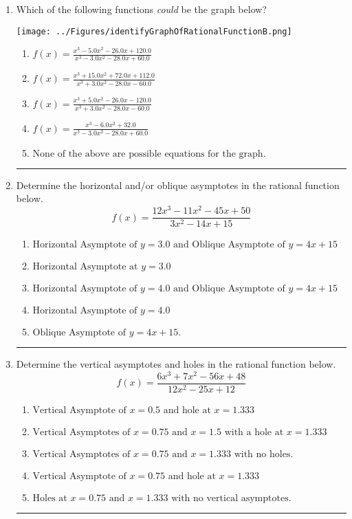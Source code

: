\documentclass[14pt]{extbook}
\newcommand{\litem}[1]{\item#1\hspace*{-1cm}\rule{\textwidth}{0.4pt}}
\begin{document}
\begin{enumerate}
\litem{
Which of the following functions \textit{could} be the graph below?
\begin{center}
    \texttt{[image: ../Figures/identifyGraphOfRationalFunctionB.png]}
\end{center}
\begin{enumerate}[label=\Alph*.]
\item \( f(x)=\frac{x^{3} -5.0 x^{2} -26.0 x + 120.0}{x^{3} -3.0 x^{2} -28.0 x + 60.0} \)
\item \( f(x)=\frac{x^{3} +15.0 x^{2} +72.0 x + 112.0}{x^{3} +3.0 x^{2} -28.0 x -60.0} \)
\item \( f(x)=\frac{x^{3} +5.0 x^{2} -26.0 x -120.0}{x^{3} +3.0 x^{2} -28.0 x -60.0} \)
\item \( f(x)=\frac{x^{3} -6.0 x^{2} + 32.0}{x^{3} -3.0 x^{2} -28.0 x + 60.0} \)
\item \( \text{None of the above are possible equations for the graph.} \)

\end{enumerate} }
\litem{
Determine the horizontal and/or oblique asymptotes in the rational function below.\[ f(x) = \frac{12x^{3} -11 x^{2} -45 x + 50}{3x^{2} -14 x + 15} \]\begin{enumerate}[label=\Alph*.]
\item \( \text{Horizontal Asymptote of } y = 3.0 \text{ and Oblique Asymptote of } y = 4x + 15 \)
\item \( \text{Horizontal Asymptote at } y = 3.0 \)
\item \( \text{Horizontal Asymptote of } y = 4.0 \text{ and Oblique Asymptote of } y = 4x + 15 \)
\item \( \text{Horizontal Asymptote of } y = 4.0  \)
\item \( \text{Oblique Asymptote of } y = 4x + 15. \)

\end{enumerate} }
\litem{
Determine the vertical asymptotes and holes in the rational function below.\[ f(x) = \frac{6x^{3} +7 x^{2} -56 x + 48}{12x^{2} -25 x + 12} \]\begin{enumerate}[label=\Alph*.]
\item \( \text{Vertical Asymptote of } x = 0.5 \text{ and hole at } x = 1.333 \)
\item \( \text{Vertical Asymptotes of } x = 0.75 \text{ and } x = 1.5 \text{ with a hole at } x = 1.333 \)
\item \( \text{Vertical Asymptotes of } x = 0.75 \text{ and } x = 1.333 \text{ with no holes.} \)
\item \( \text{Vertical Asymptote of } x = 0.75 \text{ and hole at } x = 1.333 \)
\item \( \text{Holes at } x = 0.75 \text{ and } x = 1.333 \text{ with no vertical asymptotes.} \)


\end{enumerate}}
\end{enumerate}
\end{document}
